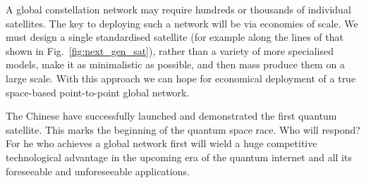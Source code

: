A global constellation network may require hundreds or thousands of individual satellites. The key to deploying such a network will be via economies of scale. We must design a single standardised satellite (for example along the lines of that shown in Fig.~\ref{fig:next_gen_sat}), rather than a variety of more specialised models, make it as minimalistic as possible, and then mass produce them on a large scale. With this approach we can hope for economical deployment of a true space-based point-to-point global network.

The Chinese have successfully launched and demonstrated the first quantum satellite. This marks the beginning of the quantum space race. Who will respond? For he who achieves a global network first will wield a huge competitive technological advantage in the upcoming era of the quantum internet and all its foreseeable and unforeseeable applications.